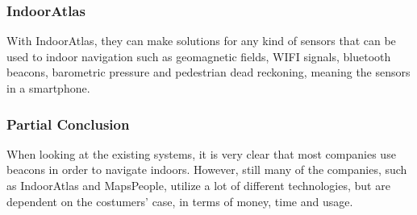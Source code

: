 \subsubsection{IndoorAtlas} %
With IndoorAtlas, they can make solutions for any kind of sensors that can be used to indoor navigation such as geomagnetic fields, WIFI signals, bluetooth beacons, barometric pressure and pedestrian dead reckoning, meaning the sensors in a smartphone.


\subsubsection{Partial Conclusion}
When looking at the existing systems, it is very clear that most companies use beacons in order to navigate indoors. However, still many of the companies, such as IndoorAtlas and MapsPeople, utilize a lot of different technologies, but are dependent on the costumers' case, in terms of money, time and usage.

